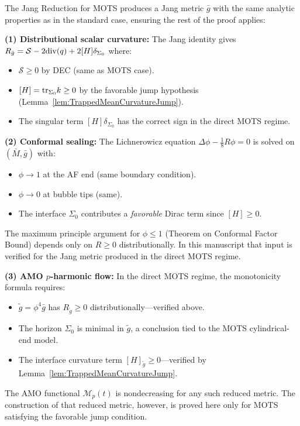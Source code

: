 \begin{remark}\label{rem:CompatibilityWithRest}
The Jang Reduction for MOTS produces a Jang metric $\bar{g}$ with the same analytic properties as in the standard case, ensuring the rest of the proof applies:

\textbf{(1) Distributional scalar curvature:} The Jang identity gives $R_{\bar{g}} = \mathcal{S} - 2\mathrm{div}(q) + 2[H]\delta_{\Sigma_0}$ where:
\begin{itemize}
    \item $\mathcal{S} \ge 0$ by DEC (same as MOTS case).
    \item $[H] = \mathrm{tr}_{\Sigma_0} k \ge 0$ by the favorable jump hypothesis (Lemma~\ref{lem:TrappedMeanCurvatureJump}).
    \item The singular term $[H]\delta_{\Sigma_0}$ has the correct sign in the direct MOTS regime.
\end{itemize}

\textbf{(2) Conformal sealing:} The Lichnerowicz equation $\Delta\phi - \frac{1}{8}R\phi = 0$ is solved on $(\bar{M}, \bar{g})$ with:
\begin{itemize}
    \item $\phi \to 1$ at the AF end (same boundary condition).
    \item $\phi \to 0$ at bubble tips (same).
    \item The interface $\Sigma_0$ contributes a \emph{favorable} Dirac term since $[H] \ge 0$.
\end{itemize}
The maximum principle argument for $\phi \le 1$ (Theorem on Conformal Factor Bound) depends only on $R \ge 0$ distributionally. In this manuscript that input is verified for the Jang metric produced in the direct MOTS regime.

\textbf{(3) AMO $p$-harmonic flow:} In the direct MOTS regime, the monotonicity formula requires:
\begin{itemize}
    \item $\tilde{g} = \phi^4 \bar{g}$ has $R_{\tilde{g}} \ge 0$ distributionally---verified above.
    \item The horizon $\Sigma_0$ is minimal in $\tilde{g}$, a conclusion tied to the MOTS cylindrical-end model.
    \item The interface curvature term $[H]_{\tilde{g}} \ge 0$---verified by Lemma~\ref{lem:TrappedMeanCurvatureJump}.
\end{itemize}
The AMO functional $\mathcal{M}_p(t)$ is nondecreasing for any such reduced metric. The construction of that reduced metric, however, is proved here only for MOTS satisfying the favorable jump condition.


\end{remark}
